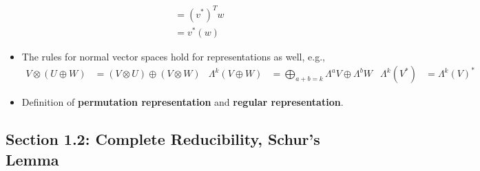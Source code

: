 \documentclass[../notes.tex]{subfiles}
\begin{document}
\begin{itemize}
\begin{itemize}
\begin{align*}
            &= (v^*)^Tw\\
            &= v^*(w)
        \end{align*}
    \end{itemize}
    \item The rules for normal vector spaces hold for representations as well, e.g.,
    \begin{align*}
        V\otimes(U\oplus W) &= (V\otimes U)\oplus(V\otimes W)&
        \Lambda^k(V\oplus W) &= \bigoplus_{a+b=k}\Lambda^aV\oplus\Lambda^bW&
        \Lambda^k(V^*) &= \Lambda^k(V)^*
    \end{align*}
    \item Definition of \textbf{permutation representation} and \textbf{regular representation}.
\end{itemize}


\subsection*{Section 1.2: Complete Reducibility, Schur's Lemma}
\end{document}
